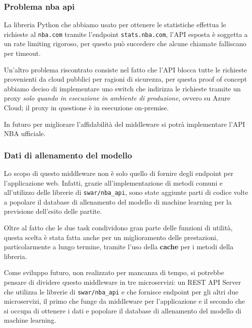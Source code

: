 \subsubsection{Problema nba api}

La libreria Python che abbiamo usato per ottenere le statistiche effettua le richieste al \texttt{nba.com} tramite l'endpoint \texttt{stats.nba.com}, l'API esposta è soggetta a un rate limiting rigoroso, per questo può succedere che alcune chiamate falliscano per timeout.

Un'altro problema riscontrato consiste nel fatto che l'API blocca tutte le richieste provenienti da cloud pubblici per ragioni di sicurezza, per questa proof of concept abbiamo deciso di implementare uno switch che indirizza le richieste tramite un proxy \textit{solo quando in esecuzione in ambiente di produzione}, ovvero su Azure Cloud; il proxy in questione è in esecuzione on-premise.

In futuro per migliorare l'affidabilità del middleware si potrà implementare l'API NBA ufficiale.

\subsubsection{Dati di allenamento del modello}
Lo scopo di questo middleware non è solo quello di fornire degli endpoint per l'applicazione web. Infatti, grazie all'implementazione di metodi comuni e all'utilizzo delle librerie di \texttt{swar/nba\_api}, sono state aggiunte parti di codice volte a popolare il database di allenamento del modello di machine learning per la previsione dell'esito delle partite.

Oltre al fatto che le due task condividono gran parte delle funzioni di utilità, questa scelta è stata fatta anche per un miglioramento delle prestazioni, particolarmente a lungo termine, tramite l'uso della \textbf{cache} per i metodi della libreria.

Come sviluppo futuro, non realizzato per mancanza di tempo, si potrebbe pensare di dividere questo middleware in tre microservizi: un REST API Server che utilizza le librerie di \texttt{swar/nba\_api} e che fornisce endpoint per gli altri due microservizi, il primo che funge da middleware per l'applicazione e il secondo che si occupa di ottenere i dati e popolare il database di allenamento del modello di machine learning.

